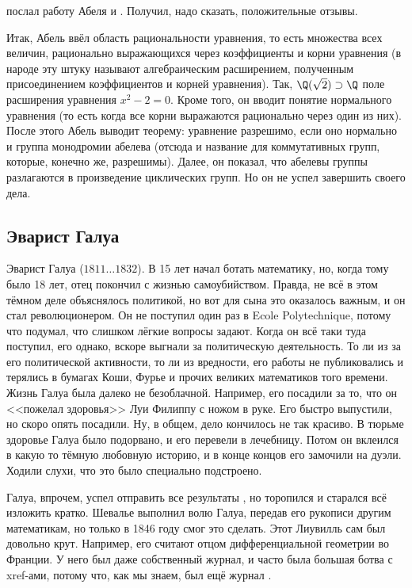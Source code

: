 \documentclass[a4paper,oneside,fleqn,10pt]{article}
\newcommand{\pe}[2]{${#1}\ldots{#2}$}
\begin{document}
 послал работу Абеля  и .
Получил, надо сказать, положительные отзывы.

Итак, Абель ввёл область рациональности уравнения, то есть множества всех величин, рационально
выражающихся через коэффициенты и корни уравнения (в народе эту штуку называют алгебраическим
расширением, полученным присоединением коэффициентов и корней уравнения).
Так, $\Q(\sqrt2) \supset \Q$ поле расширения уравнения $x^2 -2=0$.
Кроме того, он вводит понятие нормального уравнения (то есть когда все корни выражаются
рационально через один из них). После этого Абель выводит теорему:
уравнение разрешимо, если оно нормально и группа монодромии абелева (отсюда и название
для коммутативных групп, которые, конечно же, разрешимы).
Далее, он показал, что абелевы группы разлагаются в произведение циклических групп.
Но он не успел завершить своего дела.

\subsection{Эварист Галуа}

Эварист Галуа (\pe{1811}{1832}). В 15 лет начал ботать математику, но, когда тому было 18 лет, отец покончил с жизнью
самоубийством. Правда, не всё в этом тёмном деле объяснялось политикой,
но вот для сына это оказалось важным, и он стал революционером.
Он не поступил один раз в Ecole Polytechnique, потому что подумал, что слишком лёгкие вопросы
задают. Когда он всё таки туда поступил, его однако, вскоре выгнали за политическую деятельность.
То ли из за его политической активности, то ли из вредности, его работы не публиковались
и терялись в бумагах Коши, Фурье и прочих великих математиков того времени.
Жизнь Галуа была далеко не безоблачной. Например, его посадили за то, что он <<пожелал здоровья>>
Луи Филиппу с ножом в руке. Его быстро выпустили, но скоро опять посадили.
Ну, в общем, дело кончилось не так красиво. В тюрьме здоровье Галуа было подорвано,
и его перевели в лечебницу. Потом он вклеился в какую то тёмную любовную историю,
и в конце концов его замочили на дуэли. Ходили слухи, что это было специально подстроено.

Галуа, впрочем, успел отправить все результаты , но торопился и старался всё изложить
кратко. Шевалье выполнил волю Галуа, передав его рукописи другим математикам,
но только в 1846 году 
смог это сделать. Этот Лиувилль сам был довольно крут. Например, его считают отцом дифференциальной геометрии
во Франции. У него был даже собственный журнал, и часто была большая ботва с xref-ами,
потому что, как мы знаем, был ещё журнал .
\end{document}
